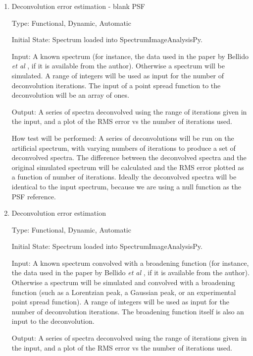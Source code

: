 \documentclass[12pt, titlepage]{article}
\newcommand{\progname}{SpectrumImageAnalysisPy}
\begin{document}
\begin{enumerate}

\item{Deconvolution error estimation - blank PSF}
\label{TFR:RLblankPSF}

Type: Functional, Dynamic, Automatic

Initial State: Spectrum loaded into \progname{}.

Input: A known spectrum (for instance, the data used in the paper by Bellido
\textit{et al} \cite{bellido_toward_2014}, if it is available from the
author). 
Otherwise a spectrum will be simulated. A range of integers will be used as
input for the number of deconvolution iterations. The input of a point spread
function to the deconvolution will be an array of ones.

Output: A series of spectra deconvolved using the range of iterations given in
the input, and a plot of the RMS error vs the number of iterations used.
					
How test will be performed: A series of deconvolutions will be run on the
artificial spectrum, with varying numbers of iterations to produce a set of
deconvolved spectra. The difference between the deconvolved spectra and the
original simulated spectrum will be calculated and the RMS error plotted as a
function of number of iterations. Ideally the deconvolved spectra will be
identical to the input spectrum, because we are using a null function as the PSF
reference.\\


\item{Deconvolution error estimation}
\label{TFR:RLerror}

Type: Functional, Dynamic, Automatic
					
Initial State: Spectrum loaded into \progname{}.

Input: A known spectrum convolved with a broadening function (for instance, the
data used in the paper by Bellido \textit{et al} \cite{bellido_toward_2014}, if
it is available from the author). Otherwise a spectrum will be simulated and
convolved with a broadening function (such as a Lorentzian peak, a Gaussian
peak, or an experimental point spread function). A range of integers will be
used as input for the number of deconvolution iterations. The broadening
function itself is also an input to the deconvolution.

Output: A series of spectra deconvolved using the range of iterations given in
the input, and a plot of the RMS error vs the number of iterations used.
					

\end{enumerate}
\end{document}
